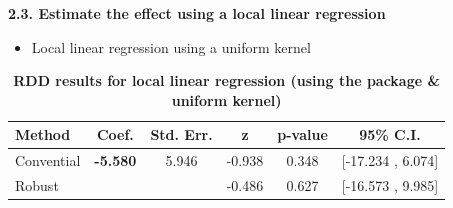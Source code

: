 \documentclass[a4paper]{article}
\begin{document}
\FloatBarrier

\noindent \textbf{2.3. Estimate the effect using a local linear regression}

\begin{itemize}
	\item Local linear regression using a uniform kernel 
\end{itemize}



\begin{table}[ht!]
		\caption{\textbf{RDD results for local linear regression (using the package \& uniform kernel)}} 
	\begin{center}
			\begin{threeparttable}
				\begin{tabular}{lccccc}
					\hline
					Method & Coef. & Std. Err. & z & p-value & 95\% C.I. \\
					\hline
					Convential & \textbf{-5.580} & 5.946  & -0.938 & 0.348  & [-17.234 , 6.074] \\
					Robust & & & -0.486 &  0.627 &  [-16.573 , 9.985]  \\
					\hline
				\end{tabular}
				\end{threeparttable}
		\end{center}
	\end{table}
\end{document}
